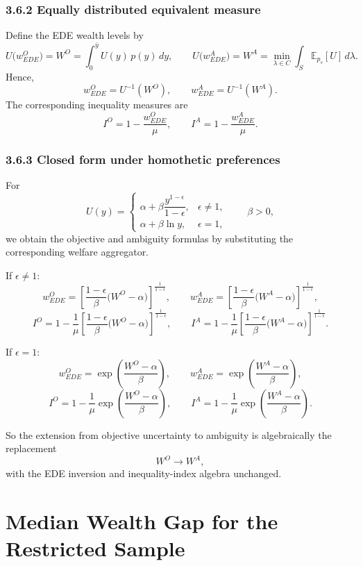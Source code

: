 \documentclass[Chp3.tex]{subfiles}
\begin{document}
\subsubsection*{3.6.2 Equally distributed equivalent measure}

Define the EDE wealth levels by
\[
U\big(w_{EDE}^O\big)=W^{O} = \int_0^{\bar y} U(y)\,p(y)\,dy,
\qquad
U\big(w_{EDE}^A\big)= W^{A} = \min_{\lambda\in C}\int_S \mathbb{E}_{p_s}[U] \, d\lambda.
\]
Hence,
\[
w_{EDE}^O = U^{-1}(W^{O}),
\qquad
w_{EDE}^A = U^{-1}(W^{A}).
\]
The corresponding inequality measures are
\[
I^{O} = 1-\frac{w_{EDE}^O}{\mu},
\qquad
I^{A} = 1-\frac{w_{EDE}^A}{\mu}.
\]

\subsubsection*{3.6.3 Closed form under homothetic preferences}

For
\[
U(y)=
\begin{cases}
\alpha + \beta\dfrac{y^{1-\epsilon}}{1-\epsilon}, & \epsilon\neq 1,\\
\alpha + \beta\ln y, & \epsilon=1,
\end{cases}
\qquad \beta>0,
\]
we obtain the objective and ambiguity formulas by substituting the corresponding welfare aggregator.

If $\epsilon\neq 1$:
\[
w_{EDE}^O=\left[\frac{1-\epsilon}{\beta}\big(W^{O}-\alpha\big)\right]^{\frac{1}{1-\epsilon}},
\qquad
w_{EDE}^A=\left[\frac{1-\epsilon}{\beta}\big(W^{A}-\alpha\big)\right]^{\frac{1}{1-\epsilon}},
\]
\[
I^{O} = 1-\frac{1}{\mu}\left[\frac{1-\epsilon}{\beta}\big(W^{O}-\alpha\big)\right]^{\frac{1}{1-\epsilon}},
\qquad
I^{A} = 1-\frac{1}{\mu}\left[\frac{1-\epsilon}{\beta}\big(W^{A}-\alpha\big)\right]^{\frac{1}{1-\epsilon}}.
\]

If $\epsilon=1$:
\[
w_{EDE}^O=\exp\!\left(\frac{W^{O}-\alpha}{\beta}\right),
\qquad
w_{EDE}^A=\exp\!\left(\frac{W^{A}-\alpha}{\beta}\right),
\]
\[
I^{O} = 1-\frac{1}{\mu}\exp\!\left(\frac{W^{O}-\alpha}{\beta}\right),
\qquad
I^{A} = 1-\frac{1}{\mu}\exp\!\left(\frac{W^{A}-\alpha}{\beta}\right).
\]

\par So the extension from objective uncertainty to ambiguity is algebraically the replacement
\[
W^{O} \longrightarrow W^{A},
\]
with the EDE inversion and inequality-index algebra unchanged.

\section{Median Wealth Gap for the Restricted Sample}
\label{app:restricted-gap-diagnostic}
\end{document}
